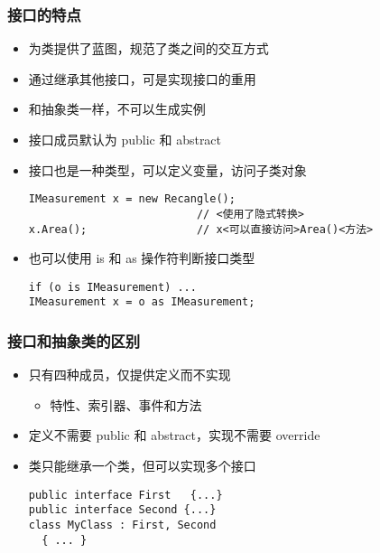 \begin{frame}[fragile]
\frametitle{接口的特点}
\begin{itemize}
\item 为类提供了蓝图，规范了类之间的交互方式
\item 通过继承其他接口，可是实现接口的重用
\item 和抽象类一样，不可以生成实例
\item 接口成员默认为 public 和 abstract
\item 接口也是一种类型，可以定义变量，访问子类对象
\begin{lstlisting}[escapeinside=<>]
IMeasurement x = new Recangle(); 
                          // <使用了隐式转换>
x.Area();                 // x<可以直接访问>Area()<方法>
\end{lstlisting}
\item 也可以使用 is 和 as 操作符判断接口类型
\begin{lstlisting}
if (o is IMeasurement) ...
IMeasurement x = o as IMeasurement;
\end{lstlisting}
\end{itemize}
\end{frame}

\begin{frame}[fragile]
\frametitle{接口和抽象类的区别}
\begin{itemize}
\setlength{\itemsep}{8pt plus 1pt}
\item 只有四种成员，仅提供定义而不实现
  \begin{itemize}
  \item 特性、索引器、事件和方法
  \end{itemize}
\item 定义不需要 public 和 abstract，实现不需要 override
\item 类只能继承一个类，但可以实现多个接口

\begin{lstlisting}
public interface First   {...}
public interface Second {...}
class MyClass : First, Second
  { ... }
\end{lstlisting}
\end{itemize}
\end{frame}


